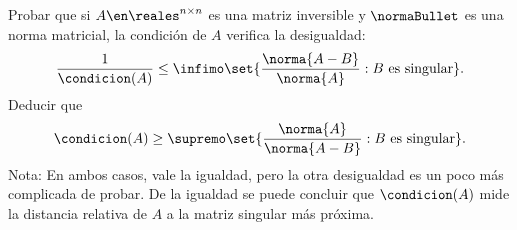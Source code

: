 \begin{enunciado}{\ejercicio}
  Probar que si $A \en \reales^{n \times n}$ es una matriz inversible y $\normaBullet$ es una norma matricial,
  la condición de $A$ verifica la desigualdad:
  $$
    \frac{1}{\condicion(A)}
    \leq
    \infimo \set{\frac{\norma{A - B}}{\norma{A}} : B \text{ es singular}}.
  $$
  Deducir que
  $$
    \condicion(A)
    \geq
    \supremo \set{\frac{\norma{A}}{\norma{A - B}} : B \text{ es singular}}.
  $$
  Nota: En ambos casos, vale la igualdad, pero la otra desigualdad es un poco más complicada de probar. De
  la igualdad se puede concluir que $\condicion(A)$ mide la distancia relativa de $A$ a la matriz
  singular más próxima.
\end{enunciado}
 \hacer
